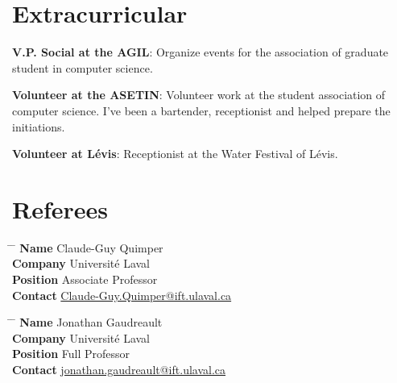 \documentclass[10pt]{article} %
\begin{document}
\section{Extracurricular}

\textbf{V.P. Social at the AGIL}: Organize events for the association of graduate student in computer science.

\textbf{Volunteer at the ASETIN}: Volunteer work at the student association of computer science. I've been a bartender, receptionist and helped prepare the initiations.

\textbf{Volunteer at Lévis}: Receptionist at the Water Festival of Lévis.

\section{Referees}

\parbox{0.5\textwidth}{ 
\begin{tabbing}
\hspace{2.75cm} \= \hspace{4cm} \= \kill 
{\bf Name} \> Claude-Guy Quimper \\ 
{\bf Company} \> Université Laval \\ 
{\bf Position} \> Associate Professor \\  
{\bf Contact} \> \href{mailto:Claude-Guy.Quimper@ift.ulaval.ca}{Claude-Guy.Quimper@ift.ulaval.ca} 
\end{tabbing}}
\hfill 
\parbox{0.5\textwidth}{
\begin{tabbing}
\hspace{2.75cm} \= \hspace{4cm} \= \kill
{\bf Name} \> Jonathan Gaudreault\\ 
{\bf Company} \> Université Laval \\ 
{\bf Position} \> Full Professor \\ 
{\bf Contact} \> \href{mailto:jonathan.gaudreault@ift.ulaval.ca}{jonathan.gaudreault@ift.ulaval.ca}
\end{tabbing}}

\end{document}
